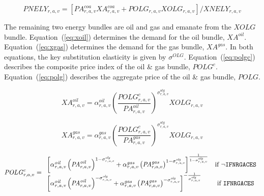 \documentclass[11pt,letterpaper]{report}
\begin{document}
\begin{equation}
\label{eq:pnely}
\mathit{PNELY}_{r,a,v} = \left[\mathit{PA}^{\mathit{coa}}_{r,a,v} \mathit{XA}^{\mathit{coa}}_{r,a,v}
+ \mathit{POLG}_{r,a,v}  \mathit{XOLG}_{r,a,v} \right] \bigg / \mathit{XNELY}_{r,a,v}
\end{equation}

The remaining two energy bundles are oil and gas and emanate from the
$\mathit{XOLG}$ bundle. Equation~(\ref{eq:xoil}) determines the demand for the
oil bundle, $\mathit{XA}^{\mathit{oil}}$. Equation~(\ref{eq:xgas}) determines
the demand for the gas bundle, $\mathit{XA}^{\mathit{gas}}$. In both equations,
the key substitution elasticity is given by $\sigma^{\mathit{OLG}}$.
Equation~(\ref{eq:polgc}) describes the composite price index of the oil \& gas
bundle, $\mathit{POLG}^c$. Equation~(\ref{eq:polg}) describes the aggregate
price of the oil \& gas bundle, $\mathit{POLG}$.

\begin{equation}
\label{eq:xoil}
\mathit{XA}^{\mathit{oil}}_{r,a,v} =
   \alpha^{\mathit{oil}}_{\mathit{r,a,v}}
   \left( \frac {\mathit{POLG}^c_{r,a,v}} {\mathit{PA}^{\mathit{oil}}_{r,a,v}}
   \right)^{\sigma^{\mathit{olg}}_{\mathit{r,a,v}}}
   \mathit{XOLG_{r,a,v}}
\end{equation}

\begin{equation}
\label{eq:xgas}
\mathit{XA}^{\mathit{gas}}_{r,a,v} =
   \alpha^{\mathit{gas}}_{\mathit{r,a,v}}
   \left( \frac {\mathit{POLG}^c_{r,a,v}} {\mathit{PA}^{\mathit{gas}}_{r,a,v}}
   \right)^{\sigma^{\mathit{olg}}_{\mathit{r,a,v}}}
   \mathit{XOLG}_{r,a,v}
\end{equation}

\begin{equation}
\label{eq:polgc}
\mathit{POLG}^c_{r,a,v} =
\begin{array}{l c l}
   \left[
      \alpha^{\mathit{oil}}_{\mathit{r,a,v}}
      \left( \mathit{PA}^{\mathit{oil}}_{r,a,v}
      \right)^{1 - \sigma^{\mathit{olg}}_{\mathit{r,a,v}}}
   +  \alpha^{\mathit{gas}}_{\mathit{r,a,v}}
      \left( \mathit{PA}^{\mathit{gas}}_{r,a,v}
      \right)^{1 - \sigma^{\mathit{olg}}_{\mathit{r,a,v}}}
   \right]^{\frac{1} {1 - \sigma^{\mathit{olg}}_{\mathit{r,a,v}}}} &
	\textrm{if } \lnot \texttt{IFNRGACES} \\
   \left[
      \alpha^{\mathit{oil}}_{\mathit{r,a,v}}
            \left( \mathit{PA}^{\mathit{oil}}_{r,a,v}
            \right)^{- \sigma^{\mathit{olg}}_{\mathit{r,a,v}}}
         +  \alpha^{\mathit{gas}}_{\mathit{r,a,v}}
            \left( \mathit{PA}^{\mathit{gas}}_{r,a,v}
            \right)^{- \sigma^{\mathit{olg}}_{\mathit{r,a,v}}}
         \right]^{-\frac{1} {\sigma^{\mathit{olg}}_{\mathit{r,a,v}}}} &
	\textrm{if } \texttt{IFNRGACES} \\
\end{array}
\end{equation}
\end{document}
